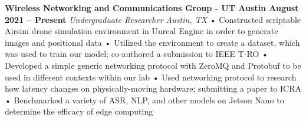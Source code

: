 \documentclass[../main.tex]{subfiles}
\begin{document}
%
\noindent\textbf{{\fontsize{\textFontSize}{\textFontBox}\selectfont Wireless Networking and Communications Group - UT Austin \hfill August 2021 – Present}}
\vspace{-1.5mm}\newline
%
{\fontsize{\textFontSize}{\textFontBox}\selectfont\emph{Undergraduate Researcher \hfill Austin, TX \hspace{0 cm}}}\vspace{0cm}\newline
%
%
{\fontsize{\textFontSize}{\textFontBox}\selectfont • \hspace{1mm} Constructed scriptable Airsim drone simulation environment in Unreal Engine in order to generate images and positional data }\newline
{\fontsize{\textFontSize}{\textFontBox}\selectfont • \hspace{1mm} Utilized the environment to create a dataset, which was used to train our model; co-authored a submission to IEEE T-RO }\newline
{\fontsize{\textFontSize}{\textFontBox}\selectfont • \hspace{1mm} Developed a simple generic networking protocol with ZeroMQ and Protobuf to be used in different contexts within our lab }\newline
{\fontsize{\textFontSize}{\textFontBox}\selectfont • \hspace{1mm} Used networking protocol to research how latency changes on physically-moving hardware; submitting a paper to ICRA }\newline
{\fontsize{\textFontSize}{\textFontBox}\selectfont • \hspace{1mm} Benchmarked a variety of ASR, NLP, and other models on Jetson Nano to determine the efficacy of edge computing }\vspace{0mm}\newline
%
%
\vspace{-6mm}\newline
%
%
\end{document}
